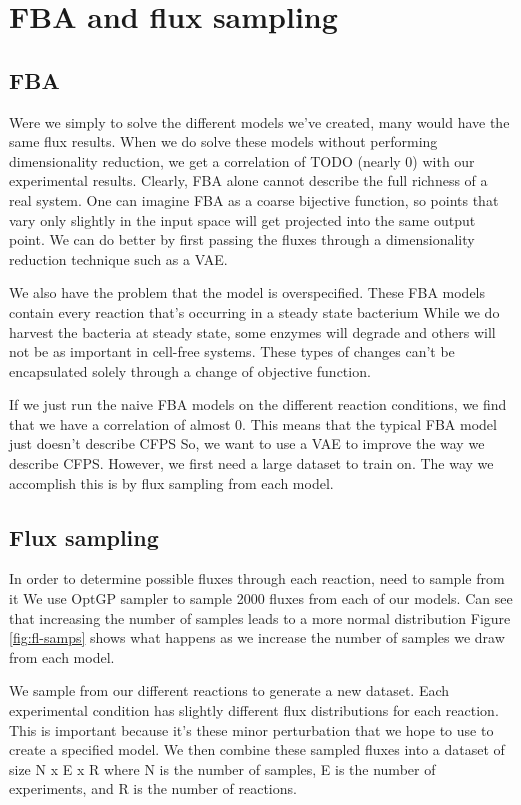 \section{FBA and flux sampling}

\subsection{FBA}

Were we simply to solve the different models we've created, many would have the same flux results.
When we do solve these models without performing dimensionality reduction, we get a correlation of TODO (nearly 0) with our experimental results.
Clearly, FBA alone cannot describe the full richness of a real system.
One can imagine FBA as a coarse bijective function, so points that vary only slightly in the input space will get projected into the same output point.
We can do better by first passing the fluxes through a dimensionality reduction technique such as a VAE.

We also have the problem that the model is overspecified.
These FBA models contain every reaction that's occurring in a steady state bacterium
While we do harvest the bacteria at steady state, some enzymes will degrade and others will not be as important in cell-free systems.
These types of changes can't be encapsulated solely through a change of objective function.

If we just run the naive FBA models on the different reaction conditions, we find that we have a correlation of almost 0.
This means that the typical FBA model just doesn't describe CFPS
So, we want to use a VAE to improve the way we describe CFPS.
However, we first need a large dataset to train on.
The way we accomplish this is by flux sampling from each model.

\subsection{Flux sampling}
In order to determine possible fluxes through each reaction, need to sample from it
We use OptGP sampler to sample 2000 fluxes from each of our models.
Can see that increasing the number of samples leads to a more normal distribution
Figure \ref{fig:fl-samps} shows what happens as we increase the number of samples we draw from each model.

We sample from our different reactions to generate a new dataset.
Each experimental condition has slightly different flux distributions for each reaction.
This is important because it's these minor perturbation that we hope to use to create a specified model.
We then combine these sampled fluxes into a dataset of size N x E x R where N is the number of samples, E is the number of experiments, and R is the number of reactions.

